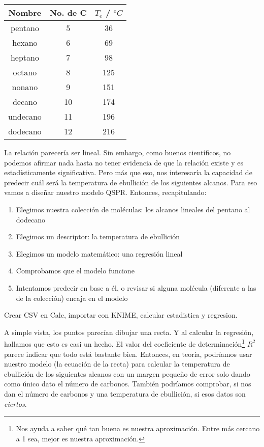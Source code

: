 \documentclass[10pt,letterpaper]{article}
\begin{document}
\begin{center}
\begin{tabular}{ccc}
\hline
\textbf{Nombre} & \textbf{No. de C} & \textbf{$T_{e}$ / $^o C$}\\
\hline
pentano & 5 & 36\\
hexano & 6 & 69\\
heptano & 7 & 98\\
octano & 8 & 125\\
nonano & 9 & 151\\
decano & 10 & 174\\
undecano & 11 & 196\\
dodecano & 12 & 216\\
\hline
\end{tabular}
\end{center}

La relaci\'on parecer\'ia ser lineal. Sin embargo, como buenos cient\'ificos, no podemos afirmar nada hasta no tener evidencia de que la relaci\'on existe y es estad\'isticamente significativa. Pero m\'as que eso, nos interesar\'ia la capacidad de predecir cu\'al ser\'a la temperatura de ebullici\'on de los siguientes alcanos. Para eso vamos a dise\~nar nuestro modelo QSPR. Entonces, recapitulando:

\begin{enumerate}
\item Elegimos nuestra colecci\'on de mol\'eculas: los alcanos lineales del pentano al dodecano
\item Elegimos un descriptor: la temperatura de ebullici\'on
\item Elegimos un modelo matem\'atico: una regresi\'on lineal
\item Comprobamos que el modelo funcione
\item Intentamos predecir en base a \'el, o revisar si alguna mol\'ecula (diferente a las de la colecci\'on) encaja en el modelo
\end{enumerate}

Crear CSV en Calc, importar con KNIME, calcular estadistica y regresion.

A simple vista, los puntos parec\'ian dibujar una recta. Y al calcular la regresi\'on, hallamos que esto es casi un hecho. El valor del coeficiente de determinaci\'on\footnote{Nos ayuda a saber qu\'e tan buena es nuestra aproximaci\'on. Entre m\'as cercano a 1 sea, mejor es nuestra aproximaci\'on.} $R^2$ parece indicar que todo est\'a bastante bien. Entonces, en teor\'ia, podr\'iamos usar nuestro modelo (la ecuaci\'on de la recta) para calcular la temperatura de ebullici\'on de los siguientes alcanos con un margen peque\~no de error solo dando como \'unico dato el n\'umero de carbonos. Tambi\'en podr\'iamos comprobar, si nos dan el n\'umero de carbonos y una temperatura de ebullici\'on, si esos datos son \textit{ciertos}.\\
\end{document}
